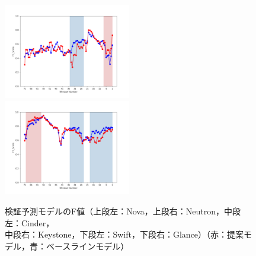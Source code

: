 \documentclass[11pt]{jreport}
\begin{document}
\begin{figure}[H]
\begin{minipage}{\textwidth}
\begin{center}
    \includegraphics[width=0.495\textwidth]{Uenaka_fig/RQ1_result/Swift_review_F1.pdf}
    \includegraphics[width=0.495\textwidth]{Uenaka_fig/RQ1_result/Glance_review_F1.pdf}
    \caption{検証予測モデルのF値（上段左：Nova，上段右：Neutron，中段左：Cinder，\\ 中段右：Keystone，下段左：Swift，下段右：Glance）（赤：提案モデル，青：ベースラインモデル）}
    \label{fig:review_f}
\end{center}
\vspace{0.08\textheight}
\end{minipage}
\end{figure}
\end{document}
